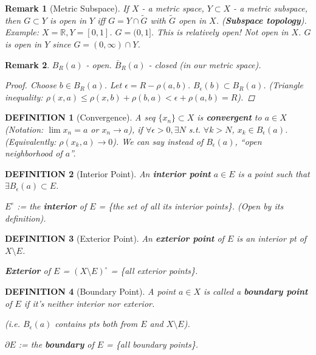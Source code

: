 \documentclass[12pt]{article}
\theoremstyle{blueplain}
\theoremstyle{bluedef}
\newtheorem{definition}{DEFINITION}[section]
\theoremstyle{blueremark}
\newtheorem{remark}{Remark}[section]
\newcommand{\R}{\mathbb{R}}
\numberwithin{equation}{section}
\begin{document}
      \begin{remark}[Metric Subspace]
        If $X$ - a metric space, $Y \subset X$ - a metric subspace, then $G \subset Y$ is open in $Y$ iff $G = Y \cap \tilde{G}$ with $\tilde{G}$ open in $X$.
        (\textbf{Subspace topology}).
        Example: $X = \R, Y = [0, 1]$. $G = (0, 1]$.
        This is relatively open! Not open in $X$.
        $G$ is open in $Y$ since $G = (0, \infty) \cap Y$.
      \end{remark}

      \begin{remark}
        $B_R(a)$ - open. $\bar{B}_R(a)$ - closed (in our metric space).
        \begin{proof}
          Choose $b \in B_R(a)$. Let $\epsilon = R - \rho(a, b)$.
          $B_\epsilon(b) \subset B_R(a)$.
          (Triangle inequality: $\rho(x, a) \leq \rho(x, b) + \rho(b, a) < \epsilon + \rho(a, b) = R$).
        \end{proof}
      \end{remark}

      \begin{definition}[Convergence]
        A seq $\{x_n\} \subset X$ is \textbf{convergent} to $a \in X$ (Notation: $\lim x_n = a$ or $x_n \to a$), if $\forall \epsilon > 0, \exists N$ s.t. $\forall k > N$, $x_k \in B_\epsilon(a)$.
        (Equivalently: $\rho(x_k, a) \to 0$).
        We can say instead of $B_\epsilon(a)$, ``open neighborhood of $a$''.
      \end{definition}

      \begin{definition}[Interior Point]
        An \textbf{interior point} $a \in E$ is a point such that $\exists B_\epsilon(a) \subset E$.

        $E^\circ$ := the \textbf{interior} of $E$ = \{the set of all its interior points\}. (Open by its definition).
      \end{definition}

      \begin{definition}[Exterior Point]
        An \textbf{exterior point} of $E$ is an interior pt of $X \setminus E$.

        \textbf{Exterior} of $E$ = $(X \setminus E)^\circ$ = \{all exterior points\}.
      \end{definition}

      \begin{definition}[Boundary Point]
        A point $a \in X$ is called a \textbf{boundary point} of $E$ if it's neither interior nor exterior.

        (i.e. $B_\epsilon(a)$ contains pts both from $E$ and $X \setminus E$).

        $\partial E$ := the \textbf{boundary} of $E$ = \{all boundary points\}.
      \end{definition}
\end{document}
